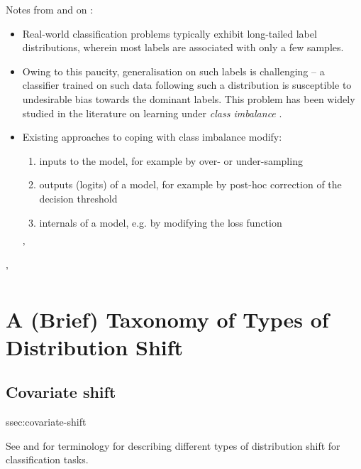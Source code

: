 Notes from and on \cite{menon2020long}:
%
\begin{itemize}
        \item Real-world classification problems typically exhibit long-tailed label distributions,
          wherein most labels are associated with only a few samples.
        \item Owing to this paucity, generalisation on such labels is challenging -- a classifier
          trained on such data following such a distribution is susceptible to undesirable bias
          towards the dominant labels. 
          This problem has been widely studied in the literature on learning under \emph{class
          imbalance} \citep{cardie1997improving}.
        \item 
          Existing approaches to coping with class imbalance modify: 
          \begin{enumerate}
            \item inputs to the model, for example by over- or under-sampling
              \citep{kubat1997addressing, chawla2002smote} \item outputs (logits) of a model, for
              example by post-hoc correction of the decision threshold \citep{fawcett1996combining}
            \item internals of a model, e.g. by modifying the loss function 
          \end{enumerate}'

\end{itemize}'


\section{A (Brief) Taxonomy of Types of Distribution Shift}
\subsection{Covariate shift}{ssec:covariate-shift}

See \cite{moreno2012unifying} and \cite{castro2020causality} for terminology for describing
different types of distribution shift for classification tasks. 


